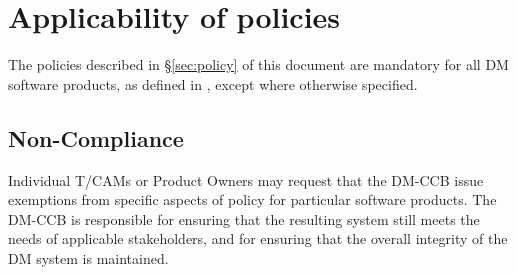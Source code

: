 \newpage
\section{Applicability of policies } \label{sec:applicability}

The policies described in \S\ref{sec:policy} of this document are mandatory for all DM software products, as defined in , except where otherwise specified.


\subsection{Non-Compliance} \label{sec:noncompliance}

Individual T/CAMs or Product Owners may request that the DM-CCB issue exemptions from specific aspects of policy for particular software products.
The DM-CCB is responsible for ensuring that the resulting system still meets the needs of applicable stakeholders, and for ensuring that the overall integrity of the DM system is maintained.
